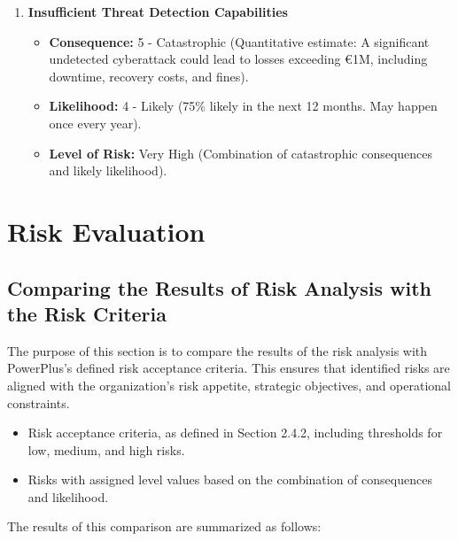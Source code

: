 \begin{enumerate}
    \item \textbf{Insufficient Threat Detection Capabilities}
    \begin{itemize}
        \item \textbf{Consequence:} 5 - Catastrophic (Quantitative estimate: A significant undetected cyberattack could lead to losses exceeding €1M, including downtime, recovery costs, and fines).
        \item \textbf{Likelihood:} 4 - Likely (75\% likely in the next 12 months. May happen once every year).
        \item \textbf{Level of Risk:} Very High (Combination of catastrophic consequences and likely likelihood).
    \end{itemize}
\end{enumerate}

\section{Risk Evaluation}

\subsection*{Comparing the Results of Risk Analysis with the Risk Criteria}

The purpose of this section is to compare the results of the risk analysis with PowerPlus’s defined risk acceptance criteria. This ensures that identified risks are aligned with the organization’s risk appetite, strategic objectives, and operational constraints.

\begin{itemize}
    \item Risk acceptance criteria, as defined in Section 2.4.2, including thresholds for low, medium, and high risks.
    \item Risks with assigned level values based on the combination of consequences and likelihood.
\end{itemize}

The results of this comparison are summarized as follows:

